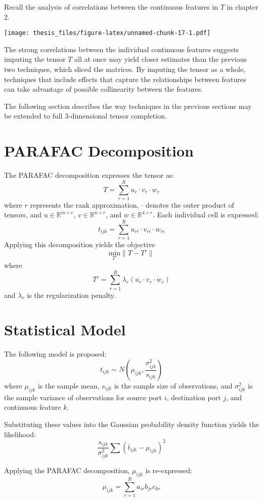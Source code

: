 \documentclass[12pt,twoside]{dukestatscithesis}
\theoremstyle{definition}
\theoremstyle{definition}
\theoremstyle{definition}
\theoremstyle{remark}
\begin{document}
Recall the analysis of correlations between the continuous features in
\(T\) in chapter 2.

\texttt{[image: thesis\_files/figure-latex/unnamed-chunk-17-1.pdf]}

The strong correlations between the individual continuous features
suggests imputing the tensor \(T\) all at once may yield closer
estimates than the previous two techniques, which sliced the matrices.
By imputing the tensor as a whole, techniques that include effects that
capture the relationships between features can take advantage of
possible collinearity between the features.

The following section describes the way techniques in the previous
sections may be extended to full 3-dimensional tensor completion.

\section{PARAFAC Decomposition}\label{parafac-decomposition}

The PARAFAC decomposition expresses the tensor as:
\[T = \sum_{r=1}^Ru_r \cdotp v_r \cdotp w_r\] where \(r\) represents the
rank approximation, \(\cdotp\) denotes the outer product of tensors, and
\(u \in \mathbb{R}^{m \times r}\), \(v \in \mathbb{R}^{n \times r}\),
and \(w \in \mathbb{R}^{4 \times r}\). Each individual cell is
expressed: \[t_{ijk} = \sum_{r=1}^Ru_{ri} \cdotp v_{ri} \cdotp w_{ri}\]
Applying this decomposition yields the objective
\[\underset{T'} {\text{min}}\|T-T'\|\] where
\[T' = \sum_{r=1}^R\lambda_r(u_r \cdotp v_r \cdotp w_r)\] and
\(\lambda_r\) is the regularization penalty.

\section{Statistical Model}\label{statistical-model}

The following model is proposed:
\[t_{ijk} \sim N(\mu_{ijk}, \frac{\sigma^2_{ijk}}{s_{ijk}})\] where
\(\mu_{ijk}\) is the sample mean, \(s_{ijk}\) is the sample size of
observations, and \(\sigma^2_{ijk}\) is the sample variance of
observations for source port \(i\), destination port \(j\), and
continuous feature \(k\).

Substituting these values into the Gaussian probability density function
yields the likelihood:
\[\frac{s_{ijk}}{\sigma^2_{ijk}}\sum(\bar t_{ijk} - \mu_{ijk})^2\]

Applying the PARAFAC decomposition, \(\mu_{ijk}\) is re-expressed:
\[\mu_{ijk} = \sum_{r=1}^Ra_{ir}b_{jr}c_{kr}\]
\end{document}

